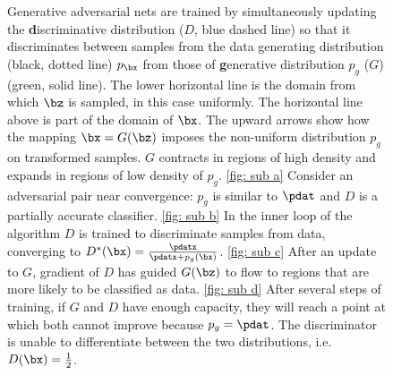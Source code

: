 
\newcommand{\gaussfunc}[2]{
	1/(sqrt(2*pi*(#1)^2))*exp(-(x-#2)^2/(2*#1^2))
}
\newcommand{\blackdottedgauss}{
	\addplot[
		domain=-5:5,
		samples=30,
		color=black,
		mark=*,
		only marks,
	]{
		\gaussfunc{1}{0}
	};
}

\newcommand{\greencont}[2]{
	\addplot[
		domain=-5:5,
		samples=60,
		color=green!60!black,
	]{
		\gaussfunc{#1}{#2}
	};
}
\begin{figure}
	\resizebox{0.2\textwidth}{!}{\subfigure[]{}\label{fig: sub a}}\hfill
	\resizebox{0.2\textwidth}{!}{\subfigure[]{}\label{fig: sub b}}\hfill
	\resizebox{0.2\textwidth}{!}{\subfigure[]{}\label{fig: sub c}}\hfill
	\resizebox{0.2\textwidth}{!}{\subfigure[]{}\label{fig: sub d}}\hfill

	\caption{Generative adversarial nets are trained by simultaneously updating the \textbf{d}iscriminative distribution ($D$, blue dashed line) so that it discriminates between samples from the data generating distribution (black, dotted line) $p_{\bx}$ from those of \textbf{g}enerative distribution $p_g$ ($G$) (green, solid line). The lower horizontal line is the domain from which $\bz$ is sampled, in this case uniformly. The horizontal line above is part of the domain of $\bx$. The upward arrows show how the mapping $\bx = G(\bz)$ imposes the non-uniform distribution $p_g$ on transformed samples. $G$ contracts in regions of high density and expands in regions of low density of $p_g$. \ref{fig: sub a} Consider an adversarial pair near convergence: $p_g$ is similar to $\pdat$ and $D$ is a partially accurate classifier. \ref{fig: sub b} In the inner loop of the algorithm $D$ is trained to discriminate samples from data, converging to $D^{\ast}(\bx) = \frac{\pdatx}{\pdatx+p_g(\bx)}$. \ref{fig: sub c} After an update to $G$, gradient of $D$ has guided $G(\bz)$ to flow to regions that are more likely to be classified as data. \ref{fig: sub d} After several steps of training, if $G$ and $D$ have enough capacity, they will reach a point at which both cannot improve because $p_g = \pdat$. The discriminator is unable to differentiate between the two distributions, i.e. $D(\bx)=\frac{1}{2}$.}
	\label{fig: figure 1}
\end{figure}
